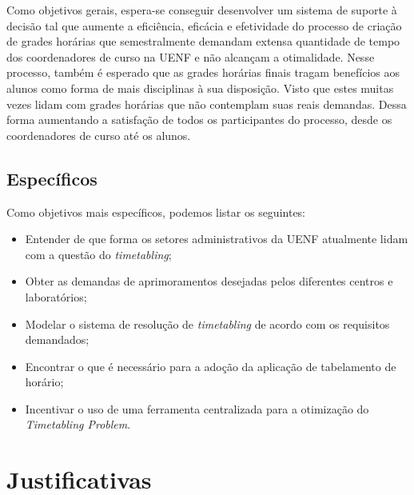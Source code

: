         Como objetivos gerais, espera-se conseguir desenvolver um sistema de suporte à decisão tal que aumente a eficiência, eficácia e efetividade do processo de criação de grades horárias que semestralmente demandam extensa quantidade de tempo dos coordenadores de curso na UENF e não alcançam a otimalidade. Nesse processo, também é esperado que as grades horárias finais tragam benefícios aos alunos como forma de mais disciplinas à sua disposição. Visto que estes muitas vezes lidam com grades horárias que não contemplam suas reais demandas. Dessa forma aumentando a satisfação de todos os participantes do processo, desde os coordenadores de curso até os alunos.

    \subsection{Específicos} %

        Como objetivos mais específicos, podemos listar os seguintes:

        \begin{itemize}
            \item Entender de que forma os setores administrativos da UENF atualmente lidam com a questão do \textit{timetabling};
            \item Obter as demandas de aprimoramentos desejadas pelos diferentes centros e laboratórios;
            \item Modelar o sistema de resolução de \textit{timetabling} de acordo com os requisitos demandados;
            \item Encontrar o que é necessário para a adoção da aplicação de tabelamento de horário;
            \item Incentivar o uso de uma ferramenta centralizada para a otimização do \textit{Timetabling Problem}.
        \end{itemize}


\section{Justificativas} %

